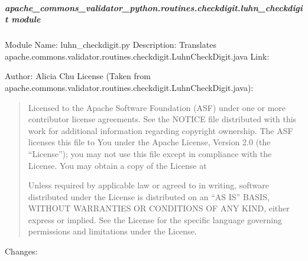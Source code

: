 \documentclass[letterpaper,10pt,english]{sphinxmanual}
\begin{document}
\subparagraph{apache\_commons\_validator\_python.routines.checkdigit.luhn\_checkdigit module}
\label{\detokenize{apache_commons_validator_python.routines.checkdigit:module-apache_commons_validator_python.routines.checkdigit.luhn_checkdigit}}\label{\detokenize{apache_commons_validator_python.routines.checkdigit:apache-commons-validator-python-routines-checkdigit-luhn-checkdigit-module}}
\sphinxAtStartPar
Module Name: luhn\_checkdigit.py
Description: Translates apache.commons.validator.routines.checkdigit.LuhnCheckDigit.java
Link: 

\sphinxAtStartPar
Author: Alicia Chu
License (Taken from apache.commons.validator.routines.checkdigit.LuhnCheckDigit.java):
\begin{quote}

\sphinxAtStartPar
Licensed to the Apache Software Foundation (ASF) under one or more
contributor license agreements. See the NOTICE file distributed with
this work for additional information regarding copyright ownership.
The ASF licenses this file to You under the Apache License, Version 2.0
(the “License”); you may not use this file except in compliance with
the License. You may obtain a copy of the License at
\begin{quote}

\sphinxAtStartPar
{}
\end{quote}

\sphinxAtStartPar
Unless required by applicable law or agreed to in writing, software
distributed under the License is distributed on an “AS IS” BASIS,
WITHOUT WARRANTIES OR CONDITIONS OF ANY KIND, either express or implied.
See the License for the specific language governing permissions and
limitations under the License.
\end{quote}

\sphinxAtStartPar
Changes:
\end{document}
